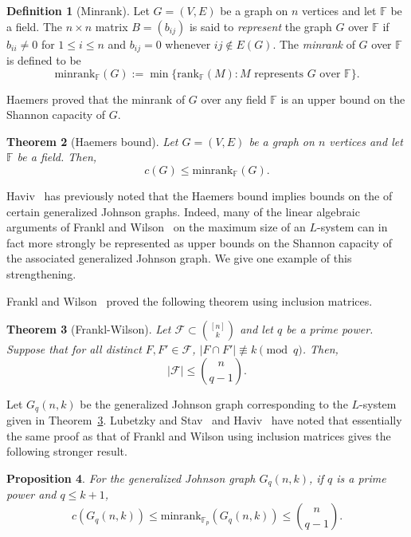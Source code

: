 \documentclass[11pt]{article}
\newtheorem{theorem}{Theorem}[section]
\newtheorem{proposition}[theorem]{Proposition}
\theoremstyle{definition}
\newtheorem{definition}[theorem]{Definition}
\theoremstyle{remark}
\newcommand{\cF}{\mathcal{F}}
\begin{document}
\begin{definition}[Minrank]\label{defn:minrank}
Let $G = (V, E)$ be a graph on $n$ vertices and let $\mathbb{F}$ be a field. The $n\times{n}$ matrix $B=(b_{ij})$ is said to \textit{represent} the graph $G$ over $\mathbb{F}$ if $b_{ii} \neq 0$ for $1\le i \le n$ and $b_{ij} = 0$ whenever $ij \notin E(G)$. The \textit{minrank} of $G$ over $\mathbb{F}$ is defined to be 
\[\text{minrank}_{\mathbb{F}}(G) := \min\{\text{rank}_{\mathbb{F}}(M): M \text{ represents } G \text{ over } \mathbb{F}\}.\]
\end{definition}

Haemers proved that the minrank of $G$ over any field $\mathbb{F}$ is an upper bound on the Shannon capacity of $G$. 

\begin{theorem}[Haemers bound]\label{thm:haembd}
Let $G = (V, E)$ be a graph on $n$ vertices and let $\mathbb{F}$ be a field. Then, 
\[c(G) \le \text{minrank}_{\mathbb{F}}(G).\]
\end{theorem}



Haviv~\cite{Haviv} has previously noted that the Haemers bound implies bounds on the  of certain generalized Johnson graphs. Indeed, many of the linear algebraic arguments of Frankl and Wilson~\cite{FW1981} on the maximum size of an $L$-system can in fact more strongly be represented as upper bounds on the Shannon capacity of the associated generalized Johnson graph. We give one example of this strengthening. 

Frankl and Wilson~\cite{FW1981} proved the following theorem using inclusion matrices. 

\begin{theorem}[Frankl-Wilson]\label{FWthm}
Let $\cF \subset \binom{[n]}{k}$ and let $q$ be a prime power. Suppose that for all distinct $F, F'\in \cF$,  $|F \cap F'| \not\equiv k\pmod{q}$. Then, 
\[|\cF| \le \binom{n}{q-1}.\]
\end{theorem}

Let $G_q(n, k)$ be the generalized Johnson graph corresponding to the $L$-system given in Theorem~\ref{FWthm}. Lubetzky and Stav~\cite{LubStav} and Haviv~\cite[Proposition 4.5]{Haviv} have noted that essentially the same proof as that of Frankl and Wilson using inclusion matrices gives the following stronger result. 

\begin{proposition}\label{lshprop}
For the generalized Johnson graph $G_q(n, k)$, if $q$ is a prime power and $q\le k+1$, 
\[c(G_q(n, k)) \le \text{minrank}_{\mathbb{F}_p}(G_q(n, k)) \le \binom{n}{q-1}.\]
\end{proposition}
\end{document}
